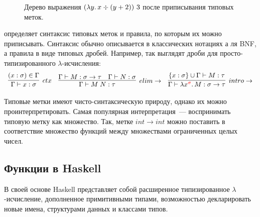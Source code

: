 \begin{figure}
    \centering
    \caption{Дерево выражения $(\lambda y\ldotp x \div (y + 2)) ~ 3$ после приписывания типовых меток.}
    \label{fig:typed}
\end{figure}

 определяет синтаксис типовых меток и правила, по которым их можно приписывать.
Синтаксис обычно описывается в классических нотациях а ля BNF, а правила в виде типовых дробей.
Например, так выглядят дроби для просто-типизированного $\lambda$-исчисления:
\[
    \begin{array}{l c r}
        \infer[ctx]{\Gamma \vdash x: \sigma}{(x: \sigma) \in \Gamma}
        &
        \infer[elim\to]{\Gamma \vdash M\;N : \tau}{\Gamma \vdash M : \sigma \to \tau & \Gamma \vdash N : \sigma}
        &
        \infer[intro\to]{\Gamma \vdash \lambda x^{\color{red} \sigma}\ldotp M : \sigma \to \tau}{\{x : \sigma\} \cup \Gamma \vdash M : \tau}
    \end{array}
\]

Типовые метки имеют чисто-синтаксическую природу, однако их можно проинтерпретировать.
Самая популярная интерпретация~--- воспринимать типовую метку как множество.
Так, метке $int \to int$ можно поставить в соответствие множество функций между множествами ограниченных целых чисел.

\subsection{Функции в Haskell}

В своей основе Haskell представляет собой расширенное типизированное $\lambda$-исчисление, дополненное примитивными типами, возможностью декларировать новые имена, структурами данных и классами типов.


